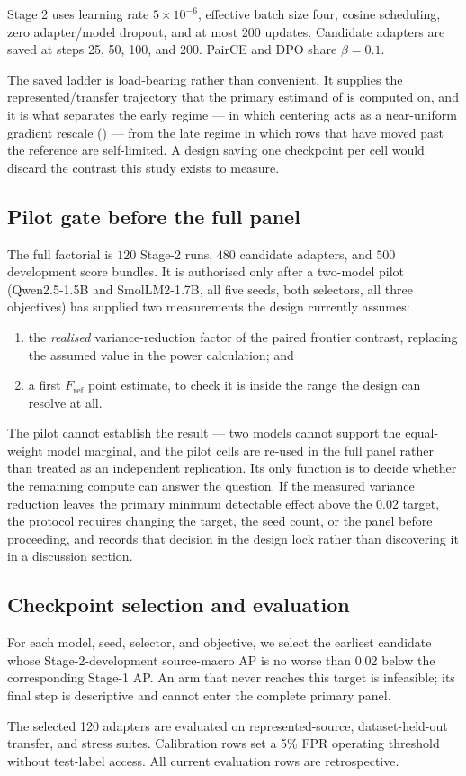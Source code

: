 Stage 2 uses learning rate $5\times10^{-6}$, effective batch size four, cosine
scheduling, zero adapter/model dropout, and at most 200 updates. Candidate
adapters are saved at steps 25, 50, 100, and 200. PairCE and DPO share
$\beta=0.1$.

The saved ladder is load-bearing rather than convenient. It supplies the
represented/transfer trajectory that the primary estimand of
 is computed on, and it is what separates the early regime --- in
which centering acts as a near-uniform gradient rescale
() --- from the late regime in which rows that have moved past
the reference are self-limited. A design saving one checkpoint per cell would
discard the contrast this study exists to measure.

\subsection{Pilot gate before the full panel}

The full factorial is $120$ Stage-2 runs, $480$ candidate adapters, and $500$
development score bundles. It is authorised only after a two-model pilot
(Qwen2.5-1.5B and SmolLM2-1.7B, all five seeds, both selectors, all three
objectives) has supplied two measurements the design currently assumes:

\begin{enumerate}\itemsep2pt
\item the \emph{realised} variance-reduction factor of the paired frontier
  contrast, replacing the assumed value in the power calculation; and
\item a first $F_{\mathrm{ref}}$ point estimate, to check it is inside the range
  the design can resolve at all.
\end{enumerate}

The pilot cannot establish the result --- two models cannot support the
equal-weight model marginal, and the pilot cells are re-used in the full panel
rather than treated as an independent replication. Its only function is to decide
whether the remaining compute can answer the question. If the measured variance
reduction leaves the primary minimum detectable effect above the $0.02$ target,
the protocol requires changing the target, the seed count, or the panel before
proceeding, and records that decision in the design lock rather than discovering
it in a discussion section.

\subsection{Checkpoint selection and evaluation}

For each model, seed, selector, and objective, we select the earliest candidate
whose Stage-2-development source-macro AP is no worse than 0.02 below the
corresponding Stage-1 AP. An arm that never reaches this target is infeasible;
its final step is descriptive and cannot enter the complete primary panel.

The selected 120 adapters are evaluated on represented-source, dataset-held-out
transfer, and stress suites. Calibration rows set a 5\% FPR operating threshold
without test-label access. All current evaluation rows are retrospective.

